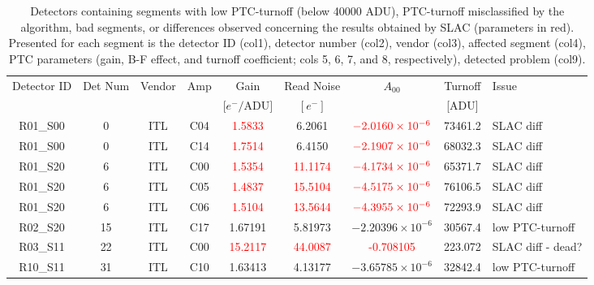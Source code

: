 \begin{landscape}
\begin{table}[!htb]
\centering
\caption{Detectors containing segments with low PTC-turnoff (below 40000 ADU), PTC-turnoff misclassified by the algorithm, bad segments, or differences observed concerning the results obtained by SLAC (parameters in red). Presented for each segment is the detector ID (col1), detector number (col2), vendor (col3), affected segment (col4), PTC parameters (gain, B-F effect, and turnoff coefficient; cols 5, 6, 7, and 8, respectively), detected problem (col9).}
\label{tab:PTC_warnings}
\begin{tabular}{ccccccccp{}}
    \hline 
     Detector ID   &   Det Num & Vendor   & Amp   &     Gain &   Read Noise &           $A_{00}$ &   Turnoff & Issue\\
      & & & & $[e^-/$ADU$]$ & $[e^-]$ & & [ADU] & \\
    \hline 
    \hline
    R01\_S00       &              0 & ITL      & C04  &   \textcolor{red}{1.5833} &   6.2061                 &  $\textcolor{red}{-2.0160 \times 10^{-6}}$ & 73461.2   &  SLAC diff \\
    R01\_S00       &              0 & ITL      & C14  &   \textcolor{red}{1.7514} &   6.4150                 &  $\textcolor{red}{-2.1907 \times 10^{-6}}$ & 68032.3   &  SLAC diff \\
    R01\_S20       &              6 & ITL      & C00  &   \textcolor{red}{1.5354} & \textcolor{red}{11.1174} &  $\textcolor{red}{-4.1734 \times 10^{-6}}$ & 65371.7   &  SLAC diff \\
    R01\_S20       &              6 & ITL      & C05  &   \textcolor{red}{1.4837} & \textcolor{red}{15.5104} &  $\textcolor{red}{-4.5175 \times 10^{-6}}$ & 76106.5   &  SLAC diff \\
    R01\_S20       &              6 & ITL      & C06  &   \textcolor{red}{1.5104} & \textcolor{red}{13.5644} &  $\textcolor{red}{-4.3955 \times 10^{-6}}$ & 72293.9   &  SLAC diff \\
    R02\_S20       &             15 & ITL      & C17  &      1.67191              &      5.81973             &  $-2.20396 \times 10^{-6}$                 & 30567.4   & low PTC-turnoff\\
    R03\_S11       &             22 & ITL      & C00  & \textcolor{red}{15.2117}  & \textcolor{red}{44.0087} &  \textcolor{red}{-0.708105}                & 223.072   & SLAC diff - dead?\\
    R10\_S11       &             31 & ITL      & C10  &      1.63413              &      4.13177             &  $-3.65785 \times 10^{-6}$                 & 32842.4   & low PTC-turnoff\\

\end{tabular}
\end{table}
\end{landscape}
